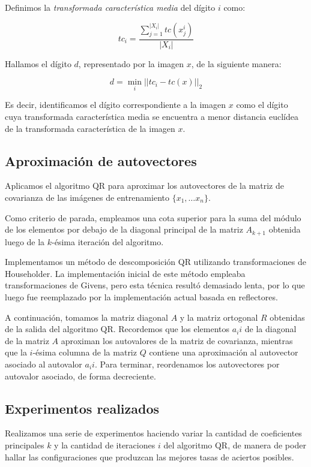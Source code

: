 \documentclass[a4paper,10pt,twoside]{article}
\begin{document}
Definimos la \textit{transformada característica media} del dígito $i$ como:

$$
tc_i = \frac{\sum_{j=1}^{|X_i|}{tc(x_j^i)}}
            {|X_i|}
$$

Hallamos el dígito $d$, representado por la imagen $x$, de la siguiente manera:

$$
d = \min_{i} || tc_i - tc(x) ||_2
$$

Es decir, identificamos el dígito correspondiente a la imagen $x$ como el dígito cuya transformada característica media se encuentra a menor distancia euclídea de la transformada característica de la imagen $x$.


\subsection{Aproximación de autovectores}

Aplicamos el algoritmo QR para aproximar los autovectores de la matriz de covarianza de las imágenes de entrenamiento $\{x_1, \ldots x_n\}$. 

Como criterio de parada, empleamos una cota superior para la suma del módulo de los elementos por debajo de la diagonal principal de la matriz $A_{k+1}$ obtenida luego de la $k$-ésima iteración del algoritmo.

Implementamos un método de descomposición QR utilizando transformaciones de Householder. La implementación inicial de este método empleaba transformaciones de Givens, pero esta técnica resultó demasiado lenta, por lo que luego fue reemplazado por la implementación actual basada en reflectores.

A continuación, tomamos la matriz diagonal $A$ y la matriz ortogonal $R$ obtenidas de la salida del algoritmo QR. Recordemos que los elementos $a_ii$ de la diagonal de la matriz $A$ aproximan los autovalores de la matriz de covarianza, mientras que la $i$-ésima columna de la matriz $Q$ contiene una aproximación al autovector asociado al autovalor $a_ii$. Para terminar, reordenamos los autovectores por autovalor asociado, de forma decreciente.


\subsection{Experimentos realizados}

Realizamos una serie de experimentos haciendo variar la cantidad de coeficientes principales $k$ y la cantidad de iteraciones $i$ del algoritmo QR, de manera de poder hallar las configuraciones que produzcan las mejores tasas de aciertos posibles.
\end{document}
